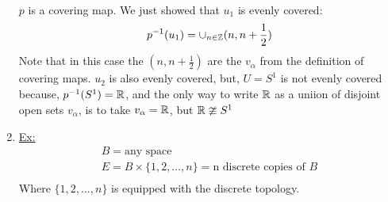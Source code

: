 \begin{enumerate}
\begin{align*}
            \end{align*}
            $p$ is a covering map. We just showed that $u_1$ is evenly covered:
            \begin{align*}
                p^{-1}(u_1)=\cup_{n\in \mathbb{Z}}(n,n+\frac{1}{2})\\
            \end{align*}
            Note that in this case the $(n, n+\frac{1}{2})$ are the $v_\alpha$ from the definition of
            covering maps. $u_2$ is also evenly covered, but, $U=S^{1}$ is not evenly covered because,
            $p^{-1}(S^{1})=\mathbb{R}$, and the only way to write $\mathbb{R}$ as a uniion of disjoint open sets $v_\alpha$,
            is to take $v_\alpha=\mathbb{R}$, but $\mathbb{R} \ncong S^1$
        \item \underline{Ex:}
            \begin{align*}
                B=\text{any space}\\
                E=B\times \{1,2,...,n\}=\text{n discrete copies of $B$}\\
            \end{align*}
            Where $\{1,2,...,n\}$ is equipped with the discrete topology.
    \end{enumerate}
